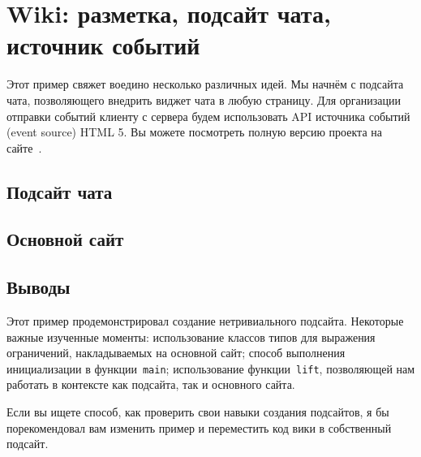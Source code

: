 \chapter{Wiki: разметка, подсайт чата, источник событий}
\label{}

Этот пример свяжет воедино несколько различных идей. Мы начнём с подсайта чата,
позволяющего внедрить виджет чата в любую страницу. Для организации отправки
событий клиенту с сервера будем использовать API источника событий (event
source) HTML 5. Вы можете посмотреть полную версию проекта на
сайте~.


\section{Подсайт чата}




\section{Основной сайт}


\section{Выводы}
Этот пример продемонстрировал создание нетривиального подсайта. Некоторые
важные изученные моменты: использование классов типов для выражения
ограничений, накладываемых на основной сайт; способ выполнения инициализации в
функции~\lstinline'main'; использование функции~\lstinline'lift', позволяющей
нам работать в контексте как подсайта, так и основного сайта.

Если вы ищете способ, как проверить свои навыки создания подсайтов, я бы
порекомендовал вам изменить пример и переместить код вики в собственный
подсайт.
